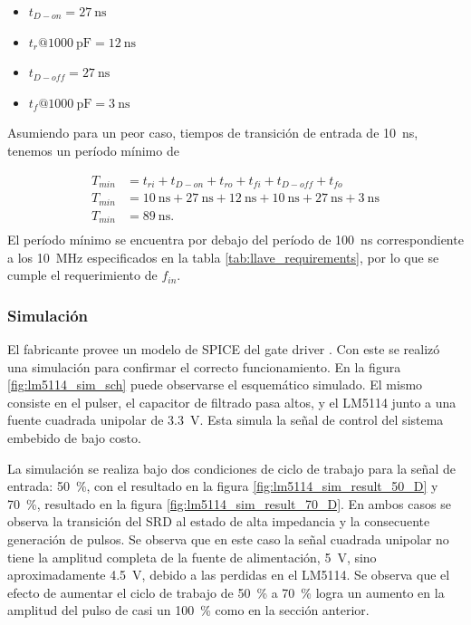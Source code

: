 \begin{itemize}
    \item $t_{D-on} = \qty{27}{\nano\second}$
    \item $t_{r} @ \qty{1000}{\pico\farad} = \qty{12}{\nano\second}$
    \item $t_{D-off} = \qty{27}{\nano\second}$
    \item $t_{f} @ \qty{1000}{\pico\farad} = \qty{3}{\nano\second}$
\end{itemize}

Asumiendo para un peor caso, tiempos de transición de entrada de
\qty{10}{\nano\second},  tenemos un período mínimo de

\begin{equation}
    \begin{aligned}
        T_{min} &= t_{ri} + t_{D-on} + t_{ro} + t_{fi} + t_{D-off} + t_{fo} \\
        T_{min} &= \qty{10}{\nano\second} + \qty{27}{\nano\second} +
        \qty{12}{\nano\second} + \qty{10}{\nano\second} + \qty{27}{\nano\second}
        + \qty{3}{\nano\second} \\
        T_{min} &= \qty{89}{\nano\second}. \\
    \end{aligned}
\end{equation}
El período mínimo se encuentra por debajo del período de \qty{100}{\nano\second}
correspondiente a los \qty{10}{\mega\hertz} especificados en
la tabla \ref{tab:llave_requirements}, por lo que se cumple el requerimiento de $f_{in}$.

\subsubsection{Simulación}

El fabricante provee un modelo de SPICE del gate driver \cite{LM5114-PSpice}.
Con este se realizó una simulación para confirmar el correcto funcionamiento. En
la figura \ref{fig:lm5114_sim_sch} puede observarse el esquemático simulado. El
mismo consiste en el pulser, el capacitor de filtrado pasa altos, y el LM5114
junto a una fuente cuadrada unipolar de \qty{3.3}{\volt}. Esta simula la señal
de control del sistema embebido de bajo costo.

La simulación se realiza bajo dos condiciones de ciclo de trabajo para la señal
de entrada: \qty{50}{\percent}, con el resultado en la figura
\ref{fig:lm5114_sim_result_50_D} y \qty{70}{\percent}, resultado en la figura
\ref{fig:lm5114_sim_result_70_D}. En ambos casos se observa la transición del
SRD al estado de alta impedancia y la consecuente generación de pulsos. Se
observa que en este caso la señal cuadrada unipolar no tiene la amplitud
completa de la fuente de alimentación, \qty{5}{\volt}, sino aproximadamente
\qty{4.5}{\volt}, debido a las perdidas en el LM5114. Se observa que el efecto
de aumentar el ciclo de trabajo de \qty{50}{\percent} a \qty{70}{\percent} logra
un aumento en la amplitud del pulso de casi un \qty{100}{\percent} como en la
sección anterior.

